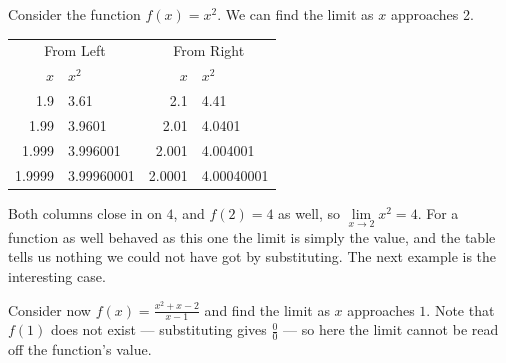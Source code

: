 \documentclass[11pt,a4paper]{article}
\theoremstyle{definition}
\begin{document}
Consider the function $f(x)=x^2$. We can find the limit as $x$ approaches 2.


\begin{figure}[H]
\centering
{}
\end{figure}






\begin{table}[H]
\centering
\begin{tabular}{rl@{\qquad\qquad}rl}
\multicolumn{2}{c}{From Left} & \multicolumn{2}{c}{From Right}\\
$x$ & $x^2$ & $x$ & $x^2$\\
1.9 & 3.61 & 2.1 & 4.41\\
1.99 & 3.9601 & 2.01 & 4.0401\\
1.999 & 3.996001 & 2.001 & 4.004001\\
1.9999 & 3.99960001 & 2.0001 & 4.00040001\\
\end{tabular}
\end{table}


\vspace{.5cm}




Both columns close in on $4$, and $f(2)=4$ as well, so
$\lim\limits_{x\to 2}x^{2}=4$. For a function as well behaved as this one the limit
is simply the value, and the table tells us nothing we could not have got by
substituting. The next example is the interesting case.

Consider now $f(x)=\frac{x^2+x-2}{x-1}$ and find the limit as $x$ approaches $1$.
Note that $f(1)$ does not exist --- substituting gives $\frac{0}{0}$ --- so here the
limit cannot be read off the function's value.\\

\begin{figure}[H]
\centering
{}
\end{figure}
\end{document}
